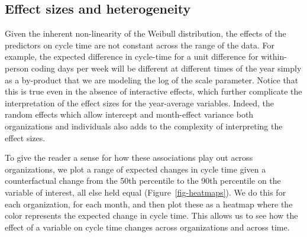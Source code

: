 \documentclass[
]{article}
\begin{document}
\subsection{Effect sizes and
heterogeneity}\label{effect-sizes-and-heterogeneity}

Given the inherent non-linearity of the Weibull distribution, the
effects of the predictors on cycle time are not constant across the
range of the data. For example, the expected difference in cycle-time
for a unit difference for within-person coding days per week will be
different at different times of the year simply as a by-product that we
are modeling the log of the scale parameter. Notice that this is true
even in the absence of interactive effects, which further complicate the
interpretation of the effect sizes for the year-average variables.
Indeed, the random effects which allow intercept and month-effect
variance both organizations and individuals also adds to the complexity
of interpreting the effect sizes.

To give the reader a sense for how these associations play out across
organizations, we plot a range of expected changes in cycle time given a
counterfactual change from the 50th percentile to the 90th percentile on
the variable of interest, all else held equal
(Figure~\ref{fig-heatmaps}). We do this for each organization, for each
month, and then plot these as a heatmap where the color represents the
expected change in cycle time. This allows us to see how the effect of a
variable on cycle time changes across organizations and across time.
\end{document}
